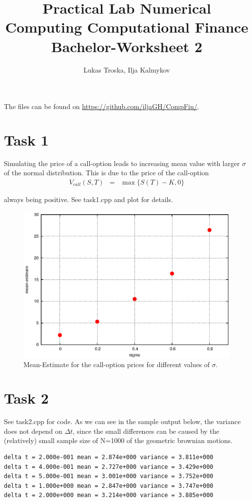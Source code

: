 \documentclass[]{article}
\title{Practical Lab Numerical Computing Computational Finance \\Bachelor-Worksheet 2}
\author{Lukas Troska, Ilja Kalmykov}
\date{}
\begin{document}
\maketitle 

The files can be found on \url{https://github.com/iljaGH/CompFin/}.

\section*{Task 1} Simulating the price of a call-option leads to
increasing mean value with larger $\sigma$ of the normal distribution. This is
due to the price of the call-option
\begin{eqnarray*}
V_{call}\left(S,T\right) & = &\max \lbrace S(T)-K,0 \rbrace
\end{eqnarray*}

always being positive. See task1.cpp and plot for details.
\begin{figure}[!ht]
\centering
\includegraphics{task1Plot}
\caption{Mean-Estimate for the call-option prices for different values of
$\sigma$.}
\label{fig:Task1}
\end{figure}


\section*{Task 2} See task2.cpp for code. As we can see in the sample output below, the variance does not depend on $\Delta t$, since the
small differences can be caused by the (relatively) small sample size of N=1000
of the geometric brownian motions.
\begin{lstlisting}[caption = estimated $\mu$ and $\sigma$ for
different values of $\Delta t$ and N = 1.0E3, captionpos=b, label=lst:Task2] 
delta t = 2.000e-001 mean = 2.874e+000 variance = 3.811e+000
delta t = 4.000e-001 mean = 2.727e+000 variance = 3.429e+000
delta t = 5.000e-001 mean = 3.001e+000 variance = 3.752e+000
delta t = 1.000e+000 mean = 2.847e+000 variance = 3.747e+000
delta t = 2.000e+000 mean = 3.214e+000 variance = 3.885e+000
\end{lstlisting}
\end{document}
